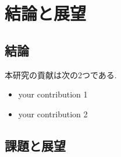 \chapter{結論と展望}

\section{結論}
本研究の貢献は次の2つである.
\begin{itemize}
	\item your contribution 1
	\item your contribution 2
\end{itemize}

\section{課題と展望}